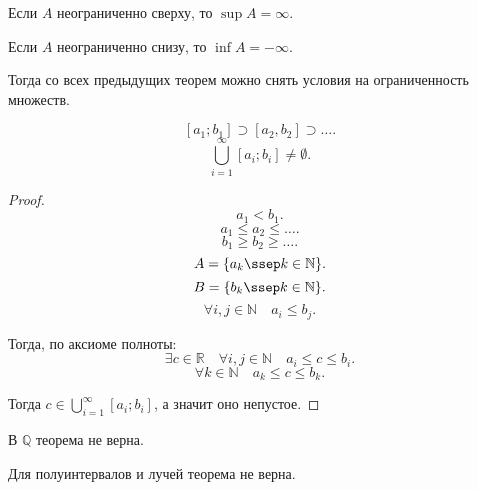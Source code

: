     \begin{definition} \slashns

        Если $A$ неограниченно сверху, то  $\sup A = \infty$.

        Если $A$ неограниченно снизу, то  $\inf A = -\infty$.
 
        Тогда со всех предыдущих теорем можно снять условия на ограниченность множеств.
    \end{definition}
    \begin{theorem}
        \[ [a_1;b_1] \supset [a_2, b_2] \supset \ldots .\]
        \[ \bigcup\limits_{i =1}^{\infty}[a_i; b_i] \neq \emptyset  .\] 
        \begin{proof}
            \[ a_1 < b_1 .\] 
            \[ a_1 \le a_2 \le \ldots .\]
            \[ b_1 \ge b_2 \ge \ldots .\]
            \[ A = \{a_k\ssep k \in \mathbb{N}\}  .\]
            \[ B = \{b_k\ssep k \in \mathbb{N}\}  .\]
            \[\forall{i, j \in \mathbb{N}}\quad a_i \le b_j .\]

            Тогда, по аксиоме полноты:
            \[ \exists{c \in \mathbb{R}}\quad \forall{i, j \in \mathbb{N}}\quad a_i \le  c \le b_i .\]
            \[ \forall{k \in \mathbb{N}}\quad a_k \le c \le b_k .\]
            
            Тогда $c \in \bigcup\limits_{i=1}^{\infty}[a_i; b_i] $, а значит оно непустое.
        \end{proof}
        \begin{remark} \slashns

            В $\mathbb{Q}$ теорема не верна.

            Для полуинтервалов и лучей теорема не верна.
        \end{remark}
    \end{theorem}        
